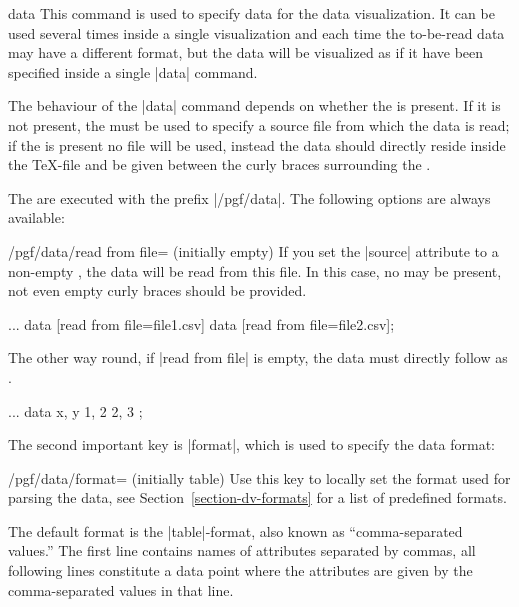 \begin{datavisualizationoperation}{data}{}
  This command is used to specify data for the data visualization. It
  can be used several times inside a single visualization and each
  time the to-be-read data may have a different format, but the data
  will be visualized as if it have been specified inside a single |data|
  command.

  The behaviour of the |data| command depends on
  whether the  is present. If it is not present, the
   must be used to specify a source file from which the
  data is read; if the  is present no file will be
  used, instead the data should directly reside inside the \TeX-file
  and be given between the curly braces surrounding the .

  The  are executed with the prefix |/pgf/data|. The
  following options are always available:
  \begin{key}{/pgf/data/read from file= (initially \normalfont empty)}
    If you set the |source| attribute to a non-empty ,
    the data will be read from this file. In this case, no
     may be present, not even empty curly braces
    should be provided.
\begin{codeexample}
\datavisualization ...
  data [read from file=file1.csv]
  data [read from file=file2.csv];
\end{codeexample}
    The other way round, if |read from file| is empty, the  data must directly
    follow as .
\begin{codeexample}
\datavisualization ...
  data {
    x, y
    1, 2
    2, 3
  };
\end{codeexample}
  \end{key}
  The second important key is |format|, which is used to specify the
  data format:
  \begin{key}{/pgf/data/format= (initially table)}
    Use this key to locally set the format used for parsing the
    data, see Section~\ref{section-dv-formats} for a list of
    predefined formats.

    The default format is the |table|-format, also known as
    ``comma-separated values.'' The first line contains names of
    attributes separated by commas, all following lines constitute a
    data point where the attributes are given by the comma-separated
    values in that line.
  \end{key}


\end{datavisualizationoperation}
